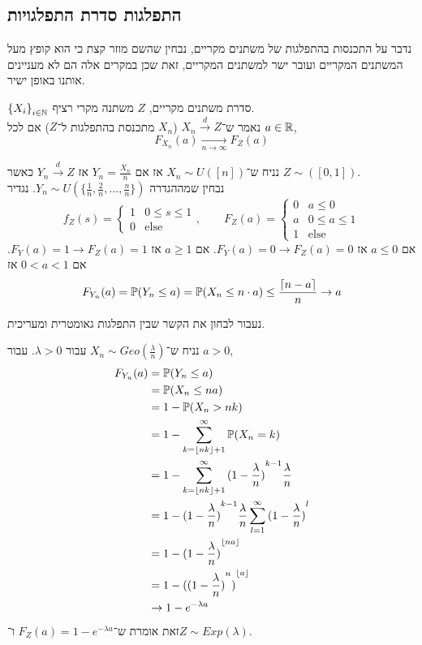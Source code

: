\subsection{התפלגות סדרת התפלגויות}
נדבר על התכנסות בהתפלגות של משתנים מקריים, נבחין שהשם מוזר קצת כי הוא קופץ מעל המשתנים המקריים ועובר ישר למשתנים המקריים, זאת שכן במקרים אלה הם לא מעניינים אותנו באופן ישיר.
\begin{definition}\label{convergence_in_distribution}
	${\{X_i\}}_{i \in \mathbb{N}}$ סדרת משתנים מקריים, $Z$ משתנה מקרי רציף. \\
	נאמר ש־$X_n \xrightarrow{d} Z$ ($X_n$ מתכנסת בהתפלגות ל־$Z$) אם לכל $a \in \mathbb{R}$,
	\[
		F_{X_n}(a) \xrightarrow[n \to \infty]{} F_Z(a)
	\]
\end{definition}
\begin{example}
	נניח ש־$X_n \sim U([n])$ אז אם $Y_n = \frac{X_n}{n}$ אז $Y_n \xrightarrow{d} Z$ כאשר $Z \sim([0, 1])$. \\
	נבחין שמההגדרה $Y_n \sim U(\{\frac{1}{n}, \frac{2}{n}, \dots, \frac{n}{n}\})$.
	נגדיר
	\[
		f_Z(s)
		= \begin{cases}
			1 & 0 \le s \le 1 \\
			0 & \text{else}
		\end{cases},
		\qquad
		F_Z(a)
		= \begin{cases}
			0 & a \le 0 \\
			a & 0 \le a \le 1 \\
			1 & \text{else}
		\end{cases}
	\]
	אם $a \le 0$ אז $F_Y(a) = 0 \to F_Z(a) = 0$.
	אם $a \ge 1$ אז $F_Y(a) = 1 \to F_Z(a) = 1$.
	אם $0 < a < 1$ אז
	\[
		F_{Y_n}(a)
		= \mathbb{P}(Y_n \le a)
		= \mathbb{P}(X_n \le n \cdot a)
		\le \frac{\lceil n - a \rceil}{n} \to a
	\]
\end{example}
נעבור לבחון את הקשר שבין התפלגות גאומטרית ומעריכית.
\begin{example}
	נניח ש־$X_n \sim Geo(\frac{\lambda}{n})$ עבור $\lambda > 0$.
	עבור $a > 0$,
	\begin{align*}
		F_{Y_n}(a)
		& = \mathbb{P}(Y_n \le a) \\
		& = \mathbb{P}(X_n \le na) \\
		& = 1 - \mathbb{P}(X_n > nk) \\
		& = 1 - \sum_{k = \lfloor nk \rfloor + 1}^{\infty} \mathbb{P}(X_n = k) \\
		& = 1 - \sum_{k = \lfloor nk \rfloor + 1}^{\infty} {(1 - \frac{\lambda}{n})}^{k - 1} \frac{\lambda}{n} \\
		& = 1 - {(1 - \frac{\lambda}{n})}^{k - 1} \frac{\lambda}{n} \sum_{l = 1}^{\infty} {(1 - \frac{\lambda}{n})}^l \\
		& = 1 - {(1 - \frac{\lambda}{n})}^{\lfloor na \rfloor} \\
		& = 1 - {({(1 - \frac{\lambda}{n})}^n)}^{\lfloor a \rfloor} \\
		& \to 1 - e^{-\lambda a}
	\end{align*}
	זאת אומרת ש־$F_Z(a) = 1 - e^{-\lambda a}$ ו־$Z \sim Exp(\lambda)$.
\end{example}

